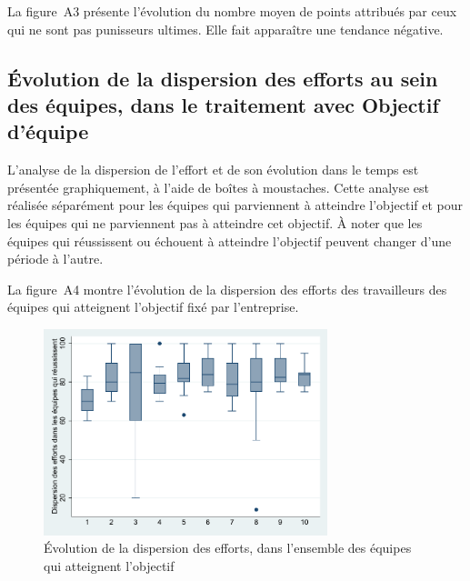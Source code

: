 \begin{Article}
\begin{refsection}[Lebourges]
\begin{appendices}
La figure~A3 présente l'évolution du nombre moyen de points attribués
par ceux qui ne sont pas punisseurs ultimes. Elle fait apparaître une
tendance négative.

\newpage

\subsection{Évolution de la dispersion des efforts au sein des équipes, dans
le traitement avec Objectif d'équipe}
\label{Annexe:Évolution dispersion des efforts}

L'analyse de la dispersion de l'effort et de son évolution dans le temps
est présentée graphiquement, à l'aide de boîtes à moustaches. Cette
analyse est réalisée séparément pour les équipes qui parviennent à
atteindre l'objectif et pour les équipes qui ne parviennent pas à
atteindre cet objectif. À noter que les équipes qui réussissent ou
échouent à atteindre l'objectif peuvent changer d'une période à l'autre.

La figure~A4 montre l'évolution de la dispersion des efforts des
travailleurs des équipes qui atteignent l'objectif fixé par
l'entreprise.

\begin{figure}[h!]
    \centering
    \caption{Évolution de la dispersion des efforts, dans l'ensemble des équipes qui atteignent l'objectif}
    \includegraphics[height=6cm]{05_graphA4.pdf}
\end{figure}


\end{appendices}
\end{refsection}
\end{Article}
